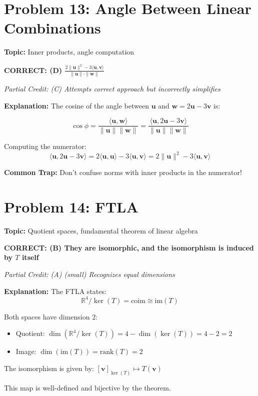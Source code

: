 \documentclass[12pt]{amsart}
\newcommand{\correct}[1]{{\color{blue}\textbf{CORRECT: #1}}}
\newcommand{\partcred}[1]{{\color{red}\textit{Partial Credit: #1}}}
\newcommand{\trap}{\textbf{Common Trap: }}
\begin{document}
\hrulefill

\section*{Problem 13: Angle Between Linear Combinations}
\textbf{Topic:} Inner products, angle computation

\correct{(D) $\frac{2\|\mathbf{u}\|^2 - 3\langle\mathbf{u},\mathbf{v}\rangle}{\|\mathbf{u}\| \cdot \|\mathbf{w}\|}$}

\partcred{(C) Attempts correct approach but incorrectly simplifies}

\textbf{Explanation:} 
The cosine of the angle between $\mathbf{u}$ and $\mathbf{w} = 2\mathbf{u} - 3\mathbf{v}$ is:

$$\cos\phi = \frac{\langle\mathbf{u}, \mathbf{w}\rangle}{\|\mathbf{u}\|\|\mathbf{w}\|} = \frac{\langle\mathbf{u}, 2\mathbf{u} - 3\mathbf{v}\rangle}{\|\mathbf{u}\|\|\mathbf{w}\|}$$

Computing the numerator:
$$\langle\mathbf{u}, 2\mathbf{u} - 3\mathbf{v}\rangle = 2\langle\mathbf{u}, \mathbf{u}\rangle - 3\langle\mathbf{u}, \mathbf{v}\rangle = 2\|\mathbf{u}\|^2 - 3\langle\mathbf{u}, \mathbf{v}\rangle$$

\trap Don't confuse norms with inner products in the numerator!

\hrulefill

\section*{Problem 14: FTLA}
\textbf{Topic:} Quotient spaces, fundamental theorem of linear algebra

\correct{(B) They are isomorphic, and the isomorphism is induced by $T$ itself}

\partcred{(A) (small) Recognizes equal dimensions}

\textbf{Explanation:} 
The FTLA states:
$$\mathbb{R}^4/\ker(T) = \text{coim} \cong \text{im}(T)$$

Both spaces have dimension 2:
\begin{itemize}
\item Quotient: $\dim(\mathbb{R}^4/\ker(T)) = 4 - \dim(\ker(T)) = 4 - 2 = 2$
\item Image: $\dim(\text{im}(T)) = \text{rank}(T) = 2$
\end{itemize}

The isomorphism is given by: $[\mathbf{v}]_{\ker(T)} \mapsto T(\mathbf{v})$

This map is well-defined and bijective by the theorem.
\end{document}
